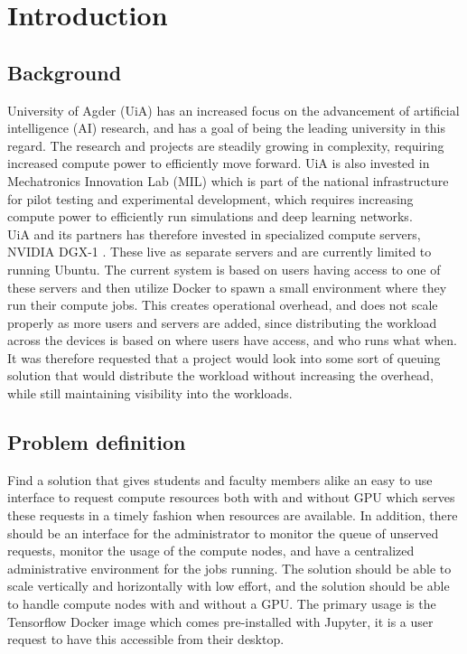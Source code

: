 \documentclass[../main.tex]{subfiles}
\begin{document}
\renewcommand{\baselinestretch}{1.5}
\chapter{Introduction}
\section{Background}
University of Agder (UiA) has an increased focus on the advancement of artificial intelligence (AI) research, and has a goal of being the leading university in this regard. The research and projects are steadily growing in complexity, requiring increased compute power to efficiently move forward. UiA is also invested in Mechatronics Innovation Lab (MIL) which is part of the national infrastructure for pilot testing and experimental development, which requires increasing compute power to efficiently run simulations and deep learning networks.\\


UiA and its partners has therefore invested in specialized compute servers, NVIDIA DGX-1 \cite{nvidia_dgx}. These live as separate servers and are currently limited to running Ubuntu. The current system is based on users having access to one of these servers and then utilize Docker to spawn a small environment where they run their compute jobs. This creates operational overhead, and does not scale properly as more users and servers are added, since distributing the workload across the devices is based on where users have access, and who runs what when.\\


It was therefore requested that a project would look into some sort of queuing solution that would distribute the workload without increasing the overhead, while still maintaining visibility into the workloads.


\pagebreak\section{Problem definition}
Find a solution that gives students and faculty members alike an easy to use interface to request compute resources both with and without GPU which serves these requests in a timely fashion when resources are available. In addition, there should be an interface for the administrator to monitor the queue of unserved requests, monitor the usage of the compute nodes, and have a centralized administrative environment for the jobs running. The solution should be able to scale vertically and horizontally with low effort, and the solution should be able to handle compute nodes with and without a GPU. The primary usage is the Tensorflow Docker image which comes pre-installed with Jupyter, it is a user request to have this accessible from their desktop. \cite{prerep}
\end{document}
